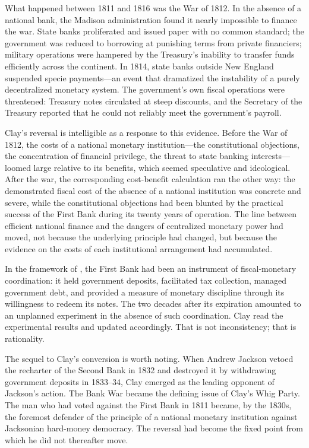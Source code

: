 \documentclass[12pt]{article}
\begin{document}
What happened between 1811 and 1816 was the War of 1812.  In the
absence of a national bank, the Madison administration found it nearly
impossible to finance the war.  State banks proliferated and issued paper
with no common standard; the government was reduced to borrowing at
punishing terms from private financiers; military operations were
hampered by the Treasury's inability to transfer funds efficiently across
the continent.  In 1814, state banks outside New England suspended specie
payments---an event that dramatized the instability of a purely
decentralized monetary system.  The government's own fiscal operations
were threatened: Treasury notes circulated at steep discounts, and the
Secretary of the Treasury reported that he could not reliably meet
the government's payroll.

Clay's reversal is intelligible as a response to this evidence.  Before
the War of 1812, the costs of a national monetary institution---the
constitutional objections, the concentration of financial privilege, the
threat to state banking interests---loomed large relative to its
benefits, which seemed speculative and ideological.  After the war, the
corresponding cost-benefit calculation ran the other way: the
demonstrated fiscal cost of the absence of a national institution was
concrete and severe, while the constitutional objections had been blunted
by the practical success of the First Bank during its twenty years of
operation.  The line between efficient national finance and the dangers
of centralized monetary power had moved, not because the underlying
principle had changed, but because the evidence on the costs of each
institutional arrangement had accumulated.

In the framework of \citet{Sargent2011}, the First Bank had been an
instrument of fiscal-monetary coordination: it held government deposits,
facilitated tax collection, managed government debt, and provided a
measure of monetary discipline through its willingness to redeem its
notes.  The two decades after its expiration amounted to an unplanned
experiment in the absence of such coordination.  Clay read the
experimental results and updated accordingly.  That is not inconsistency;
that is rationality.

The sequel to Clay's conversion is worth noting.  When Andrew Jackson
vetoed the recharter of the Second Bank in 1832 and destroyed it by
withdrawing government deposits in 1833--34, Clay emerged as the leading
opponent of Jackson's action.  The Bank War became the defining issue
of Clay's Whig Party.  The man who had voted against the First Bank in
1811 became, by the 1830s, the foremost defender of the principle of a
national monetary institution against Jacksonian hard-money democracy.
The reversal had become the fixed point from which he did not thereafter
move.
\end{document}
